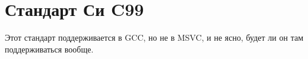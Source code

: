 ﻿\chapter{Стандарт Си C99}

Этот стандарт поддерживается в GCC, но не в MSVC, и не ясно, будет ли он там поддерживаться вообще.
